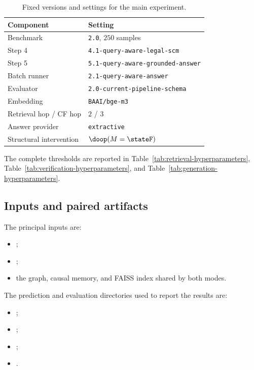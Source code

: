 \begin{table}[h]
    \centering
    \small
    \caption{Fixed versions and settings for the main experiment.}
    \label{tab:repro-settings}
    \begin{tabular}{@{}ll@{}}
        \toprule
        \textbf{Component} & \textbf{Setting} \\
        \midrule
        Benchmark & \texttt{2.0}, $250$ samples \\
        Step 4 & \texttt{4.1-query-aware-legal-scm} \\
        Step 5 & \texttt{5.1-query-aware-grounded-answer} \\
        Batch runner & \texttt{2.1-query-aware-answer} \\
        Evaluator & \texttt{2.0-current-pipeline-schema} \\
        Embedding & \texttt{BAAI/bge-m3} \\
        Retrieval hop / CF hop & $2$ / $3$ \\
        Answer provider & \texttt{extractive} \\
        Structural intervention & $\doop(M=\stateF)$ \\
        \bottomrule
    \end{tabular}
\end{table}

The complete thresholds are reported in
Table~\ref{tab:retrieval-hyperparameters},
Table~\ref{tab:verification-hyperparameters}, and
Table~\ref{tab:generation-hyperparameters}.

\subsection{Inputs and paired artifacts}

The principal inputs are:

\begin{itemize}
    \item {};
    \item {};
    \item the graph, causal memory, and FAISS index shared by both modes.
\end{itemize}

The prediction and evaluation directories used to report the results are:

\begin{itemize}
    \item {};
    \item {};
    \item {};
    \item {}.
\end{itemize}


